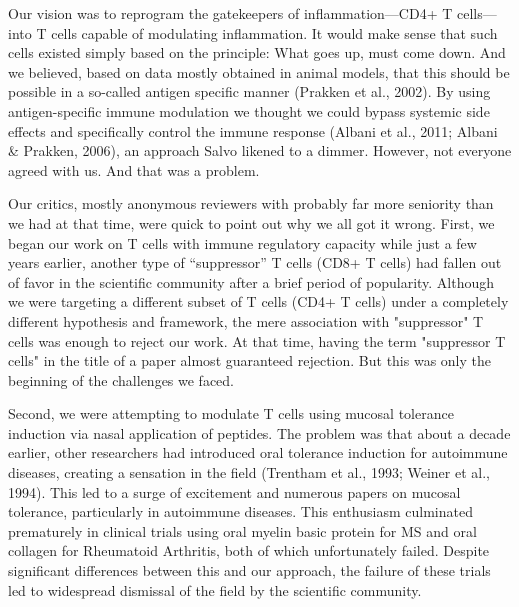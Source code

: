\documentclass[authordate, editorial]{jote-new-article}
\begin{document}
	Our vision was to reprogram the gatekeepers of inflammation—CD4+ T cells—into T cells capable of modulating inflammation. It would make sense that such cells existed simply based on the principle: What goes up, must come down. And we believed, based on data mostly obtained in animal models, that this should be possible in a so-called antigen specific manner (Prakken et al., 2002). By using antigen-specific immune modulation we thought we could bypass systemic side effects and specifically control the immune response (Albani et al., 2011; Albani \& Prakken, 2006), an approach Salvo likened to a dimmer. However, not everyone agreed with us. And that was a problem.







	Our critics, mostly anonymous reviewers with probably far more seniority than we had at that time, were quick to point out why we all got it wrong. First, we began our work on T cells with immune regulatory capacity while just a few years earlier, another type of “suppressor” T cells (CD8+ T cells) had fallen out of favor in the scientific community after a brief period of popularity. Although we were targeting a different subset of T cells (CD4+ T cells) under a completely different hypothesis and framework, the mere association with "suppressor" T cells was enough to reject our work. At that time, having the term "suppressor T cells" in the title of a paper almost guaranteed rejection. But this was only the beginning of the challenges we faced.







	Second, we were attempting to modulate T cells using mucosal tolerance induction via nasal application of peptides. The problem was that about a decade earlier, other researchers had introduced oral tolerance induction for autoimmune diseases, creating a sensation in the field (Trentham et al., 1993; Weiner et al., 1994). This led to a surge of excitement and numerous papers on mucosal tolerance, particularly in autoimmune diseases. This enthusiasm culminated prematurely in clinical trials using oral myelin basic protein for MS and oral collagen for Rheumatoid Arthritis, both of which unfortunately failed. Despite significant differences between this and our approach, the failure of these trials led to widespread dismissal of the field by the scientific community.
\end{document}
